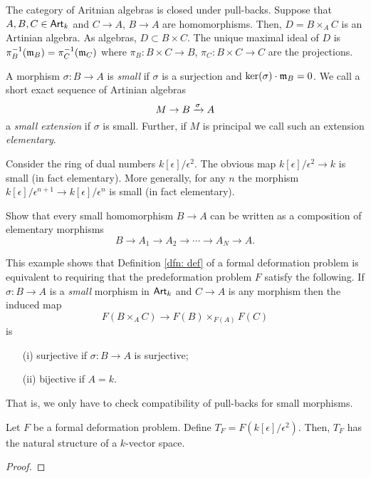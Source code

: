 \documentclass[11pt]{amsart}
\begin{document}
\begin{rmk}
The category of Aritnian algebras is closed under pull-backs. 
Suppose that $A,B,C \in {\sf Art}_k$ and $C \to A$, $B \to A$ are homomorphisms.
Then, $D = B \times_A C$ is an Artinian algebra. 
As algebras, $D \subset B \times C$. 
The unique maximal ideal of $D$ is $\pi_B^{-1}({\mathfrak m}_B) = \pi_C^{-1}({\mathfrak m}_C)$ where $\pi_B : B \times C \to B$, $\pi_C : B \times C \to C$ are the projections. 
\end{rmk}

\begin{dfn}
A morphism $\sigma : B \to A$ is {\em small} if $\sigma$ is a surjection and $\ker(\sigma) \cdot {\mathfrak m}_B = 0$. 
We call a short exact sequence of Artinian algebras
\[
M \to B \xrightarrow{\sigma} A
\]
a {\em small extension} if $\sigma$ is small. 
Further, if $M$ is principal we call such an extension {\em elementary}. 
\end{dfn}

\begin{eg}
Consider the ring of dual numbers $k[\epsilon] / \epsilon^2$. 
The obvious map $k[\epsilon] / \epsilon^2 \to k$ is small (in fact elementary). 
More generally, for any $n$ the morphism $k[\epsilon]/\epsilon^{n+1} \to k[\epsilon]/\epsilon^n$ is small (in fact elementary). 
\end{eg}

\begin{ex} 
Show that every small homomorphism $B \to A$ can be written as a composition of elementary morphisms
\[
B \to A_1 \to A_2 \to \cdots \to A_N \to A .
\]
\end{ex}

\begin{rmk}
This example shows that Definition \ref{dfn: def} of a formal deformation problem is equivalent to requiring that the predeformation problem $F$ satisfy the following. 
If $\sigma : B \to A$ is a {\em small} morphism in ${\sf Art}_k$ and $C \to A$ is any morphism then the induced map
\[
F(B \times_A C) \to F(B) \times_{F(A)} F(C)
\]
is
\begin{enumerate}
\item[(i)] surjective if $\sigma : B \to A$ is surjective;
\item[(ii)] bijective if $A = k$.
\end{enumerate}
That is, we only have to check compatibility of pull-backs for small morphisms. 
\end{rmk}

\begin{prop} Let $F$ be a formal deformation problem. 
Define $T_F = F(k[\epsilon]/\epsilon^2)$. 
Then, $T_F$ has the natural structure of a $k$-vector space. 
\end{prop}
\begin{proof}
\end{proof}
\end{document}
